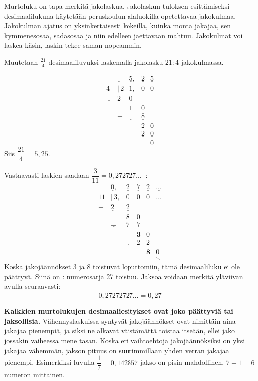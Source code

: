 Murtoluku on tapa merkitä jakolaskua. Jakolaskun tuloksen esittämiseksi desimaalilukuna
käytetään peruskoulun alaluokilla opetettavaa jakokulmaa. Jakokulman ajatus on yksinkertaisesti kokeilla, kuinka monta jakajaa, sen kymmenesosaa, sadasosaa ja niin
edelleen jaettavaan mahtuu. Jakokulmat voi laskea käsin, laskin tekee saman nopeammin.

\begin{esimerkki}
Muutetaan $\frac{21}{4}$ desimaaliluvuksi laskemalla jakolasku $21 : 4$ jakokulmassa.

\[ 
\begin{array}{cccccc}
 & \underline{ \ \ } & \underline{5}, & \underline{2} & \underline{5} \\
 4 & \!\!|\,2 & 1, & 0 & 0 \\
 \underline{-} & \underline{2}& \underline{0} \\
 & & 1 &0 \\
 & \underline{-} &\underline{ \ \ }  & \underline{8} \\
 & & & 2 & 0 \\
 & & \underline{-} & \underline{2} & \underline{0} \\
 & &  & & 0
\end{array}
\]
Siis $\dfrac{21}{4} = 5,25$.
\end{esimerkki}

Vastaavasti laskien saadaan $\dfrac{3}{11}=0,272727\ldots \ $ :
\[ 
\begin{array}{cccccc}
 & \underline{ 0}, & \underline{2} & \underline{7} & \underline{2} & 
 \underline{\ldots} \\
 11 & \!\!|\,3, & 0 & 0 & 0 & \ldots \\
 \underline{-} & \underline{2}& \underline{2} \\
 & & \boldsymbol{8} &0 \\
 & \underline{-} &\underline{ 7 }  & \underline{7} \\
 & & & \boldsymbol{3} & 0 \\
 & & \underline{-} & \underline{2} & \underline{2} \\
 & &  & & \boldsymbol{8} & 0 \\
 & & & & & \ddots
\end{array}
\]
Koska jakojäännökset 3 ja 8 toistuvat loputtomiin, tämä desimaaliluku
ei ole päättyvä. Siinä on : numerosarja 27 toistuu.
Jaksoa voidaan merkitä yläviivan avulla seuraavasti:
\[ 0,27272727\ldots = 0,\overline{27} \]

{\bf Kaikkien murtolukujen desimaaliesitykset ovat joko päättyviä tai jaksollisia.}
Vähennyslaskuissa syntyvät jakojäännökset ovat nimittäin aina jakajaa pienempiä, ja siksi
ne alkavat väistämättä toistaa itseään, ellei jako jossakin vaiheessa mene tasan.
Koska eri vaihtoehtoja jakojäännöksiksi on yksi jakajaa vähemmän,
jakson pituus on suurimmillaan yhden verran jakajaa pienempi. Esimerkiksi luvulla
$\dfrac{1}{7}=0,\overline{142857}$ jakso on pisin mahdollinen, $7-1=6$ numeron mittainen.

